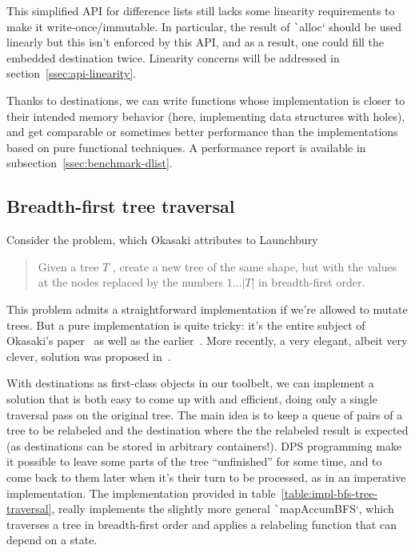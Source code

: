 \documentclass[english]{jflart}
\begin{document}
This simplified API for difference lists still lacks some linearity requirements to make it write-once/immutable. In particular, the result of \texttt`alloc` should be used linearly but this isn't enforced by this API, and as a result, one could fill the embedded destination twice. Linearity concerns will be addressed in section~\ref{ssec:api-linearity}.

Thanks to destinations, we can write functions whose implementation is closer to their intended memory behavior (here, implementing data structures with holes), and get comparable or sometimes better performance than the implementations based on pure functional techniques. A performance report is available in subsection~\ref{ssec:benchmark-dlist}.

\subsection{Breadth-first tree traversal}\label{ssec:bf-tree-traversal}

Consider the problem, which Okasaki attributes to Launchbury~\cite{okasaki_bfs_2000}
\begin{quote}
  Given a tree $T$ , create a new tree of the same
  shape, but with the values at the nodes replaced
  by the numbers $1\ldots|T|$ in breadth-first order.
\end{quote}

This problem admits a straightforward implementation if we're allowed to mutate trees. But a pure implementation is quite tricky: it's the entire subject of Okasaki's paper~\cite{okasaki_bfs_2000} as well as the earlier~\cite{jones_gibbons_linearbfs_93}. More recently, a very elegant, albeit very clever, solution was proposed in~\cite{gibbons_phases_2023}.

With destinations as first-class objects in our toolbelt, we can implement a solution that is both easy to come up with and efficient, doing only a single traversal pass on the original tree. The main idea is to keep a queue of pairs of a tree to be relabeled and the destination where the the relabeled result is expected (as destinations can be stored in arbitrary containers!). DPS programming make it possible to leave some parts of the tree ``unfinished'' for some time, and to come back to them later when it's their turn to be processed, as in an imperative implementation. The implementation provided in table~\ref{table:impl-bfs-tree-traversal}, really implements the slightly more general \texttt`mapAccumBFS`, which traverses a tree in breadth-first order and applies a relabeling function that can depend on a state.
\end{document}
